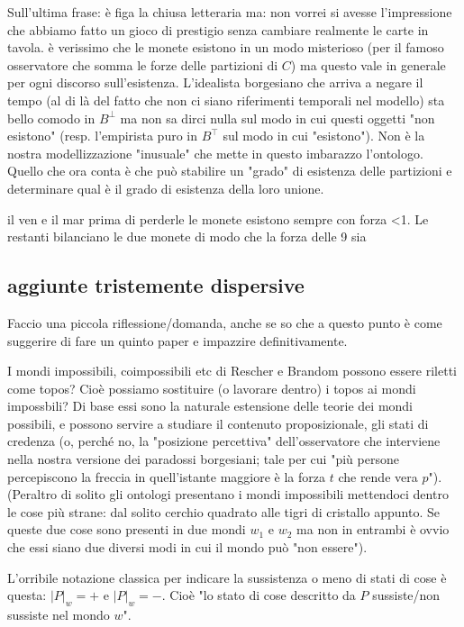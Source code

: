 \documentclass[a4paper, 11pt]{article}
\begin{document}
Sull'ultima frase: è figa la chiusa letteraria ma: non vorrei si avesse l'impressione che abbiamo fatto un gioco di prestigio senza cambiare realmente le carte in tavola. è verissimo che le monete esistono in un modo misterioso (per il famoso osservatore che somma le forze delle partizioni di $C$) ma questo vale in generale per ogni discorso sull'esistenza. L'idealista borgesiano che arriva a negare il tempo (al di là del fatto che non ci siano riferimenti temporali nel modello) sta bello comodo in $B^\bot$ ma non sa dirci nulla sul modo in cui questi oggetti "non esistono" (resp. l'empirista puro in $B^\top$ sul modo in cui "esistono"). Non è la nostra modellizzazione "inusuale" che mette in questo imbarazzo l'ontologo. Quello che ora conta è che può stabilire un "grado" di esistenza delle partizioni e determinare qual è il grado di esistenza della loro unione. 

il ven e il mar prima di perderle le monete esistono sempre con forza <1. Le restanti bilanciano le due monete di modo che la forza delle 9 sia  




\subsection{aggiunte tristemente dispersive}

Faccio una piccola riflessione/domanda, anche se so che a questo punto è come suggerire di fare un quinto paper e impazzire definitivamente.

I mondi impossibili, coimpossibili etc di Rescher e Brandom possono essere riletti come topos? Cioè possiamo sostituire (o lavorare dentro) i topos ai mondi impossbili? Di base essi sono la naturale estensione delle teorie dei mondi possibili, e possono servire a studiare il contenuto proposizionale, gli stati di credenza (o, perché no, la "posizione percettiva" dell'osservatore che interviene nella nostra versione dei paradossi borgesiani; tale per cui "più persone percepiscono la freccia in quell'istante maggiore è la forza $t$ che rende vera $p$"). (Peraltro di solito gli ontologi presentano i mondi impossibili mettendoci dentro le cose più strane: dal solito cerchio quadrato alle tigri di cristallo appunto. Se queste due cose sono presenti in due mondi $w_1$ e $w_2$ ma non in entrambi è ovvio che essi siano due diversi modi in cui il mondo può "non essere").

L'orribile notazione classica per indicare la sussistenza o meno di stati di cose è questa: $|P|_w = +$ e $|P|_w = -$. Cioè "lo stato di cose descritto da $P$ sussiste/non sussiste nel mondo $w$".
\end{document}
